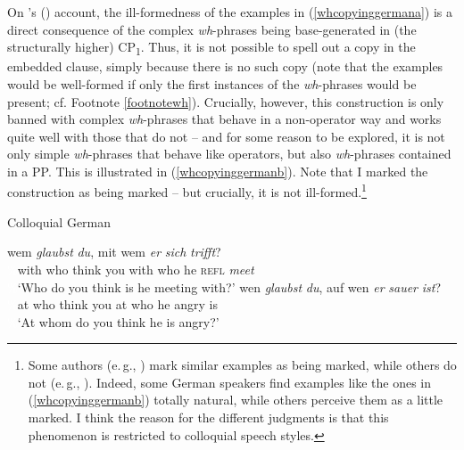 \noindent On \citeauthor{van2010complex}'s (\citeyear{van2010complex, van2012you}) account, the ill-formedness of the examples in (\ref{whcopyinggermana}) is a direct consequence of the complex \textit{wh}-phrases being base-generated in (the structurally higher) CP\textsubscript{1}. Thus, it is not possible to spell out a copy in the embedded clause, simply because there is no such copy (note that the examples would be well-formed if only the first instances of the \textit{wh}-phrases would be present; cf. Footnote \ref{footnotewh}). Crucially, however, this construction is only banned with complex \textit{wh}-phrases that behave in a non-operator way and works quite well with those that do not -- and for some reason to be explored, it is not only simple \textit{wh}-phrases that behave like operators, but also \textit{wh}-phrases contained in a PP. This is illustrated in (\ref{whcopyinggermanb}). Note that I marked the construction as being marked -- but crucially, it is not ill-formed.\footnote{ Some authors (e.\,g., \citealt{felser2004wh}) mark similar examples as being marked, while others do not (e.\,g., \citealt{van2010complex}). Indeed, some German speakers find examples like the ones in (\ref{whcopyinggermanb}) totally natural, while others perceive them as a little marked. I think the reason for the different judgments is that this phenomenon is restricted to colloquial speech styles.}

\begin{exe}
\ex Colloquial German\label{whcopyinggermanb}\begin{xlist}
\ex {} {wem} {\textit{glaubst}} {\textit{du},} {mit} {wem} {\textit{er}} {\textit{sich}} {\textit{trifft}?}   \\
{\textcolor{white}{\%}with} {who} {think} {you} {with} {who} {he} {\textsc{refl}}  {\textit{meet}}\\
\trans \textcolor{white}{\%}`Who do you think is he meeting with?' \label{ex:whcopyinggermanba}
\ex {} {wen} {\textit{glaubst}} {\textit{du},} {auf} {wen} {\textit{er}} {\textit{sauer}} {\textit{ist}?}  \\
{\textcolor{white}{\%}at} {who} {think} {you} {at} {who} {he} {angry} {is} \\
\trans \textcolor{white}{\%}`At whom do you think he is angry?' \label{ex:whcopyinggermanbb}

\end{xlist}
\end{exe}

